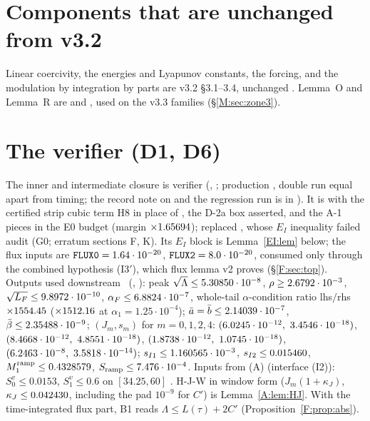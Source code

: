 \documentclass[11pt]{article}
\begin{document}
\section{Components that are unchanged from v3.2}\label{M:sec:unchanged}
Linear coercivity, the energies and Lyapunov constants, the forcing, and the modulation by integration by parts are v3.2 \S3.1--3.4, unchanged \tC. Lemma~O and Lemma~R are  and , used on the v3.3 families (\S\ref{M:sec:zone3}).

\section{The verifier (D1, D6)}\label{M:sec:verifier}
The inner and intermediate closure is verifier  (, ; production , double run equal apart from timing; the record note on  and the regression run is in ). It is  with the certified strip cubic term H8 in place of , the D-2a box asserted, and the A-1 pieces in the E0 budget (margin $\times1.65694$);  replaced , whose $E_I$ inequality failed audit (G0; erratum sections F, K). Its $E_I$ block is Lemma~\ref{EI:lem} below; the flux inputs are $\fn{FLUX0}=1.64\cdot10^{-20}$, $\fn{FLUX2}=8.0\cdot10^{-20}$, consumed only through the combined hypothesis (I3$'$), which flux lemma v2 proves (\S\ref{F:sec:top}). Outputs used downstream \tC\ (, ): peak $\sqrt\Lambda\le5.30850\cdot10^{-8}$, $\rho\ge2.6792\cdot10^{-3}$, $\sqrt{L_F}\le9.8972\cdot10^{-10}$, $\alpha_F\le6.8824\cdot10^{-7}$, whole-tail $\alpha$-condition ratio lhs$/$rhs $\times1554.45$ ($\times1512.16$ at $\alpha_1=1.25\cdot10^{-4}$); $\bar a=\bar b\le2.14039\cdot10^{-7}$, $\bar\beta\le2.35488\cdot10^{-9}$; $(J_m,s_m)$ for $m=0,1,2,4$: $(6.0245\cdot10^{-12},\ 3.4546\cdot10^{-18})$, $(8.4668\cdot10^{-12},\ 4.8551\cdot10^{-18})$, $(1.8738\cdot10^{-12},\ 1.0745\cdot10^{-18})$, $(6.2463\cdot10^{-8},\ 3.5818\cdot10^{-14})$; $s_{I1}\le1.160565\cdot10^{-3}$, $s_{I2}\le0.015460$, $M_1^{\rm ramp}\le0.4328579$, $S_{\rm ramp}\le7.476\cdot10^{-4}$. Inputs from (A) (interface (I2)): $S^v_0\le0.0153$, $S^v_1\le0.6$ on $[34.25,60]$ \tB. H-J-W in window form ($J_m(1+\kappa_J)$, $\kappa_J\le0.042430$, including the pad $10^{-9}$ for $C'$) is Lemma~\ref{A:lem:HJ}. With the time-integrated flux part, B1 reads $\Lambda\le L(\tau)+2C'$ (Proposition~\ref{F:prop:abs}).




\end{document}
